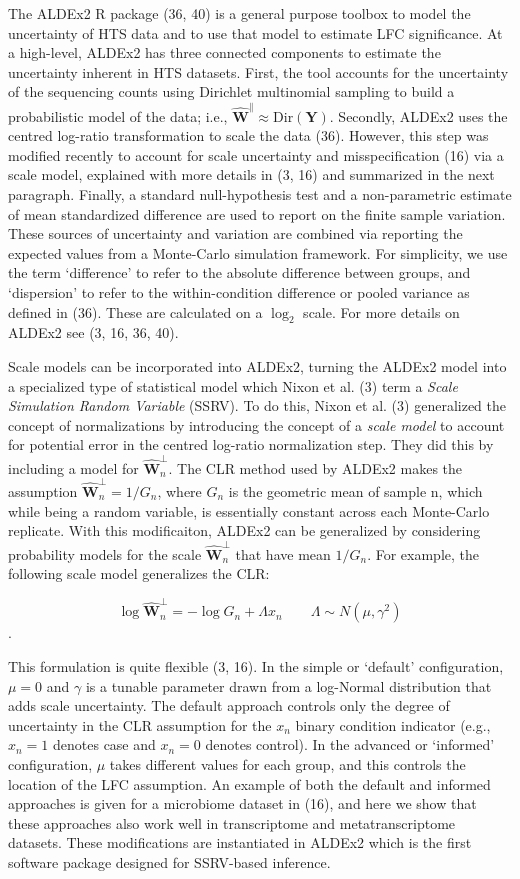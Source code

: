 \documentclass[
]{article}
\begin{document}
The ALDEx2 R package (36, 40) is a general purpose toolbox to model the
uncertainty of HTS data and to use that model to estimate LFC
significance. At a high-level, ALDEx2 has three connected components to
estimate the uncertainty inherent in HTS datasets. First, the tool
accounts for the uncertainty of the sequencing counts using Dirichlet
multinomial sampling to build a probabilistic model of the data; i.e.,
\(\mathbf{\hat{W}}^{\parallel} \approx \mathrm{Dir}(\mathbf{Y})\).
Secondly, ALDEx2 uses the centred log-ratio transformation to scale the
data (36). However, this step was modified recently to account for scale
uncertainty and misspecification (16) via a scale model, explained with
more details in (3, 16) and summarized in the next paragraph. Finally, a
standard null-hypothesis test and a non-parametric estimate of mean
standardized difference are used to report on the finite sample
variation. These sources of uncertainty and variation are combined via
reporting the expected values from a Monte-Carlo simulation framework.
For simplicity, we use the term `difference' to refer to the absolute
difference between groups, and `dispersion' to refer to the
within-condition difference or pooled variance as defined in (36). These
are calculated on a \(\log_2\) scale. For more details on ALDEx2 see (3,
16, 36, 40).

Scale models can be incorporated into ALDEx2, turning the ALDEx2 model
into a specialized type of statistical model which Nixon et al. (3) term
a \textit{Scale Simulation Random   Variable} (SSRV). To do this, Nixon
et al. (3) generalized the concept of normalizations by introducing the
concept of a \textit{scale model} to account for potential error in the
centred log-ratio normalization step. They did this by including a model
for \(\mathbf{\hat{W}}^{\perp}_{n}\). The CLR method used by ALDEx2
makes the assumption \(\mathbf{\hat{W}}^{\perp}_{n}=1/G_{n}\), where
\(G_n\) is the geometric mean of sample n, which while being a random
variable, is essentially constant across each Monte-Carlo replicate.
With this modificaiton, ALDEx2 can be generalized by considering
probability models for the scale \(\mathbf{\hat{W}}^{\perp}_{n}\) that
have mean \(1/G_{n}\). For example, the following scale model
generalizes the CLR:

\[\log \mathbf{\hat{W}}^{\perp}_{n} = -\log G_{n} + \Lambda x_{n} \qquad \Lambda \sim N(\mu, \gamma^{2})\].

This formulation is quite flexible (3, 16). In the simple or `default'
configuration, \(\mu = 0\) and \(\gamma\) is a tunable parameter drawn
from a log-Normal distribution that adds scale uncertainty. The default
approach controls only the degree of uncertainty in the CLR assumption
for the \(x_{n}\) binary condition indicator (e.g., \(x_{n}=1\) denotes
case and \(x_{n}=0\) denotes control). In the advanced or `informed'
configuration, \(\mu\) takes different values for each group, and this
controls the location of the LFC assumption. An example of both the
default and informed approaches is given for a microbiome dataset in
(16), and here we show that these approaches also work well in
transcriptome and metatranscriptome datasets. These modifications are
instantiated in ALDEx2 which is the first software package designed for
SSRV-based inference.
\end{document}
